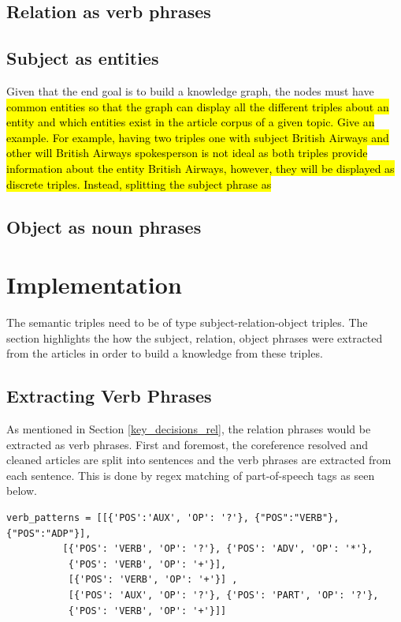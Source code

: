 \subsection{Relation as verb phrases}

\subsection{Subject as entities} \label{subject_ents}
Given that the end goal is to build a knowledge graph, the nodes must have \hl{common entities so that the graph can display all the different triples about an entity and which entities exist in the article corpus of a given topic. Give an example. For example, having two triples one with subject British Airways and other will British Airways spokesperson is not ideal as both triples provide information about the entity British Airways, however, they will be displayed as discrete triples. Instead, splitting the subject phrase as } 
\subsection{Object as noun phrases}


\section{Implementation}

The semantic triples need to be of type subject-relation-object triples. The section highlights the how the subject, relation, object phrases were extracted from the articles in order to build a knowledge from these triples. 

\subsection{Extracting Verb Phrases}

As mentioned in Section \ref{key_decisions_rel}, the relation phrases would be extracted as verb phrases. First and foremost, the coreference resolved and cleaned articles are split into sentences and the verb phrases are extracted from each sentence. This is done by regex matching of part-of-speech tags as seen below. 
\begin{verbatim}
verb_patterns = [[{'POS':'AUX', 'OP': '?'}, {"POS":"VERB"}, {"POS":"ADP"}], 
          [{'POS': 'VERB', 'OP': '?'}, {'POS': 'ADV', 'OP': '*'},
           {'POS': 'VERB', 'OP': '+'}],
           [{'POS': 'VERB', 'OP': '+'}] ,
           [{'POS': 'AUX', 'OP': '?'}, {'POS': 'PART', 'OP': '?'},
           {'POS': 'VERB', 'OP': '+'}]]
\end{verbatim}

